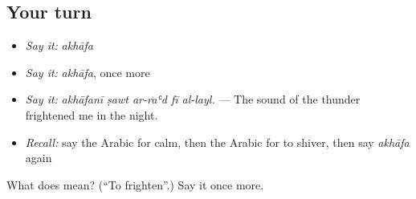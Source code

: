 \subsection*{Your turn}
\begin{itemize}
\raggedright
  \item \emph{Say it:} \emph{akhāfa}
  \item \emph{Say it:} \emph{akhāfa}, once more
  \item \emph{Say it:} \emph{akhāfanī ṣawt ar-raʿd fī al-layl.} — The sound of the thunder frightened me in the night.
  \item \emph{Recall:} say the Arabic for calm, then the Arabic for to shiver, then say \emph{akhāfa} again
\end{itemize}

\begin{tcolorbox}[breakable,colback=teal!4,colframe=teal!35!black,title={Before you move on}]
What does  mean? (\textquotedblleft{}To frighten\textquotedblright{}.) Say it once more.
\end{tcolorbox}
